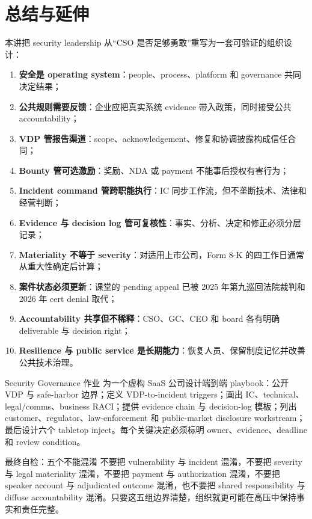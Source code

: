 \section{总结与延伸}

本讲把 security leadership 从“CSO 是否足够勇敢”重写为一套可验证的组织设计：

\begin{enumerate}
  \item \textbf{安全是 operating system}：people、process、platform 和 governance 共同决定结果；
  \item \textbf{公共规则需要反馈}：企业应把真实系统 evidence 带入政策，同时接受公共 accountability；
  \item \textbf{VDP 管报告渠道}：scope、acknowledgement、修复和协调披露构成信任合同；
  \item \textbf{Bounty 管可选激励}：奖励、NDA 或 payment 不能事后授权有害行为；
  \item \textbf{Incident command 管跨职能执行}：IC 同步工作流，但不垄断技术、法律和经营判断；
  \item \textbf{Evidence 与 decision log 管可复核性}：事实、分析、决定和修正必须分层记录；
  \item \textbf{Materiality 不等于 severity}：对适用上市公司，Form 8-K 的四工作日通常从重大性确定后计算；
  \item \textbf{案件状态必须更新}：课堂的 pending appeal 已被 2025 年第九巡回法院裁判和 2026 年 cert denial 取代；
  \item \textbf{Accountability 共享但不稀释}：CSO、GC、CEO 和 board 各有明确 deliverable 与 decision right；
  \item \textbf{Resilience 与 public service 是长期能力}：恢复人员、保留制度记忆并改善公共技术治理。
\end{enumerate}

\begin{importantbox}{Security Governance 作业}
为一个虚构 SaaS 公司设计端到端 playbook：公开 VDP 与 safe-harbor 边界；定义 VDP-to-incident triggers；画出 IC、technical、legal/comms、business RACI；提供 evidence chain 与 decision-log 模板；列出 customer、regulator、law-enforcement 和 public-market disclosure workstream；最后设计六个 tabletop inject。每个关键决定必须标明 owner、evidence、deadline 和 review condition。
\end{importantbox}

\begin{knowledgebox}{最终自检：五个不能混淆}
不要把 vulnerability 与 incident 混淆，不要把 severity 与 legal materiality 混淆，不要把 payment 与 authorization 混淆，不要把 speaker account 与 adjudicated outcome 混淆，也不要把 shared responsibility 与 diffuse accountability 混淆。只要这五组边界清楚，组织就更可能在高压中保持事实和责任完整。
\end{knowledgebox}

